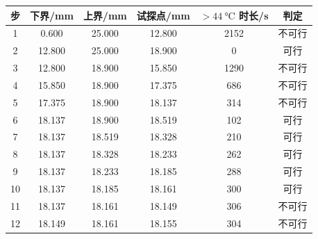 \begin{tabular}{cccccc}
  \toprule
    步 & 下界/\si{mm} & 上界/\si{mm} & 试探点/\si{mm} & $>\SI{44}{\celsius}$ 时长/\si{s} & 判定 \\
  \midrule
    1 & 0.600 & 25.000 & 12.800 & 2152 & 不可行 \\
    2 & 12.800 & 25.000 & 18.900 & 0 & 可行 \\
    3 & 12.800 & 18.900 & 15.850 & 1290 & 不可行 \\
    4 & 15.850 & 18.900 & 17.375 & 686 & 不可行 \\
    5 & 17.375 & 18.900 & 18.137 & 314 & 不可行 \\
    6 & 18.137 & 18.900 & 18.519 & 102 & 可行 \\
    7 & 18.137 & 18.519 & 18.328 & 210 & 可行 \\
    8 & 18.137 & 18.328 & 18.233 & 262 & 可行 \\
    9 & 18.137 & 18.233 & 18.185 & 288 & 可行 \\
    10 & 18.137 & 18.185 & 18.161 & 300 & 可行 \\
    11 & 18.137 & 18.161 & 18.149 & 306 & 不可行 \\
    12 & 18.149 & 18.161 & 18.155 & 304 & 不可行 \\
  \bottomrule
\end{tabular}
